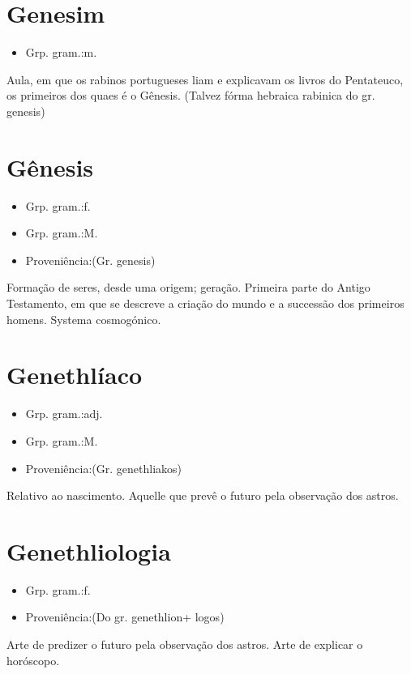 \section{Genesim}
\begin{itemize}
\item {Grp. gram.:m.}
\end{itemize}
Aula, em que os rabinos portugueses liam e explicavam os livros do \textunderscore Pentateuco\textunderscore , os primeiros dos quaes é o \textunderscore Gênesis\textunderscore .
(Talvez fórma hebraica rabinica do gr. \textunderscore genesis\textunderscore )
\section{Gênesis}
\begin{itemize}
\item {Grp. gram.:f.}
\end{itemize}
\begin{itemize}
\item {Grp. gram.:M.}
\end{itemize}
\begin{itemize}
\item {Proveniência:(Gr. \textunderscore genesis\textunderscore )}
\end{itemize}
Formação de seres, desde uma origem; geração.
Primeira parte do \textunderscore Antigo Testamento\textunderscore , em que se descreve a criação do mundo e a successão dos primeiros homens.
Systema cosmogónico.
\section{Genethlíaco}
\begin{itemize}
\item {Grp. gram.:adj.}
\end{itemize}
\begin{itemize}
\item {Grp. gram.:M.}
\end{itemize}
\begin{itemize}
\item {Proveniência:(Gr. \textunderscore genethliakos\textunderscore )}
\end{itemize}
Relativo ao nascimento.
Aquelle que prevê o futuro pela observação dos astros.
\section{Genethliologia}
\begin{itemize}
\item {Grp. gram.:f.}
\end{itemize}
\begin{itemize}
\item {Proveniência:(Do gr. \textunderscore genethlion\textunderscore  + \textunderscore logos\textunderscore )}
\end{itemize}
Arte de predizer o futuro pela observação dos astros.
Arte de explicar o horóscopo.
